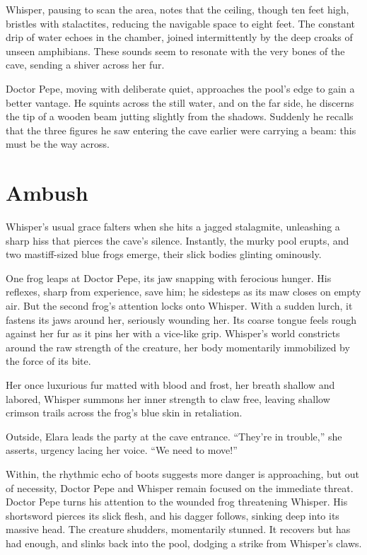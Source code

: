 \documentclass[
  letterpaper,12pt,twoside,twocolumn,openany,
  nodeprecatedcode,bg=full]{dndbook}
\begin{document}
Whisper, pausing to scan the area, notes that the ceiling, though ten
feet high, bristles with stalactites, reducing the navigable space to
eight feet. The constant drip of water echoes in the chamber, joined
intermittently by the deep croaks of unseen amphibians. These sounds
seem to resonate with the very bones of the cave, sending a shiver
across her fur.

Doctor Pepe, moving with deliberate quiet, approaches the pool's edge to
gain a better vantage. He squints across the still water, and on the far
side, he discerns the tip of a wooden beam jutting slightly from the
shadows. Suddenly he recalls that the three figures he saw entering the
cave earlier were carrying a beam: this must be the way across.

\section{Ambush}\label{ambush}

Whisper's usual grace falters when she hits a jagged stalagmite,
unleashing a sharp hiss that pierces the cave's silence. Instantly, the
murky pool erupts, and two mastiff-sized blue frogs emerge, their slick
bodies glinting ominously.

One frog leaps at Doctor Pepe, its jaw snapping with ferocious hunger.
His reflexes, sharp from experience, save him; he sidesteps as its maw
closes on empty air. But the second frog's attention locks onto Whisper.
With a sudden lurch, it fastens its jaws around her, seriously wounding
her. Its coarse tongue feels rough against her fur as it pins her with a
vice-like grip. Whisper's world constricts around the raw strength of
the creature, her body momentarily immobilized by the force of its bite.

Her once luxurious fur matted with blood and frost, her breath shallow
and labored, Whisper summons her inner strength to claw free, leaving
shallow crimson trails across the frog's blue skin in retaliation.

Outside, Elara leads the party at the cave entrance. ``They're in
trouble,'' she asserts, urgency lacing her voice. ``We need to move!''

Within, the rhythmic echo of boots suggests more danger is approaching,
but out of necessity, Doctor Pepe and Whisper remain focused on the
immediate threat. Doctor Pepe turns his attention to the wounded frog
threatening Whisper. His shortsword pierces its slick flesh, and his
dagger follows, sinking deep into its massive head. The creature
shudders, momentarily stunned. It recovers but has had enough, and
slinks back into the pool, dodging a strike from Whisper's claws.
\end{document}
